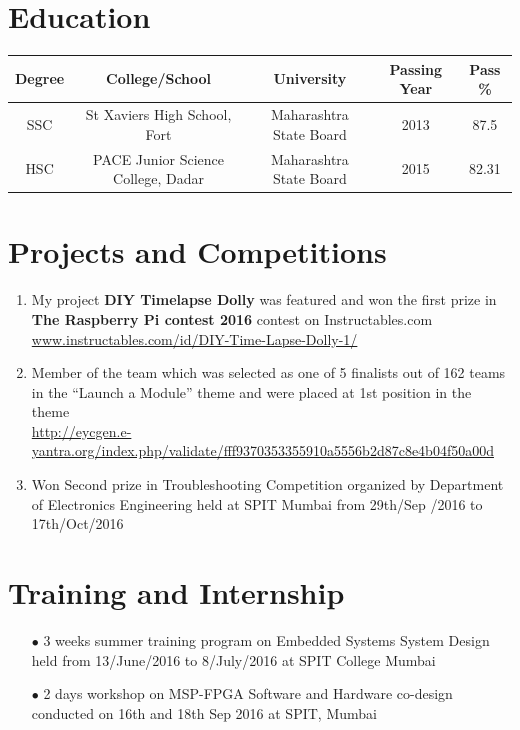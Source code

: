 \documentclass{article}
\begin{document}
	\section*{Education}
	\begin{tabular}{|c|c|c|c|c|}
		\hline
		Degree & College/School & University & Passing Year & Pass \% \\
		\hline
		SSC & St Xaviers High School, Fort & Maharashtra State Board  & 2013 & 87.5\\
		\hline
		HSC & PACE Junior Science College, Dadar & Maharashtra State Board & 2015 & 82.31\\
		\hline
	\end{tabular}

	\section*{Projects and Competitions}
	\begin{enumerate}%
		
		\item My project \textbf{DIY Timelapse Dolly} was featured and won the first prize in \textbf{The Raspberry Pi contest 2016} contest on Instructables.com\\
		\url{www.instructables.com/id/DIY-Time-Lapse-Dolly-1/}
		\item Member of the team which was selected as one of 5 finalists out of 162 teams in the “Launch a Module” theme and were placed at 1st position in the theme\\
		\url{http://eycgen.e-yantra.org/index.php/validate/fff9370353355910a5556b2d87c8e4b04f50a00d}
		\item Won Second prize in Troubleshooting Competition organized by Department of Electronics Engineering held at SPIT Mumbai from 29th/Sep /2016 to 17th/Oct/2016
	\end{enumerate}

	\section*{Training and Internship}
	\begin{itemize}
		\item[$\bullet$] 3 weeks summer training program on Embedded Systems System Design held from 13/June/2016 to 8/July/2016 at SPIT College Mumbai
		\item[$\bullet$] 2 days workshop on MSP-FPGA Software and Hardware co-design conducted on 16th and 18th Sep 2016 at SPIT, Mumbai
	\end{itemize}
\end{document}
